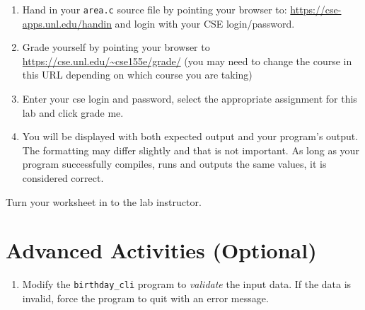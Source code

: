 \documentclass[12pt]{scrartcl}
\begin{document}
\begin{enumerate}
  \item Hand in your \texttt{area.c} source file by pointing your browser to:
  	\url{https://cse-apps.unl.edu/handin} and login with your CSE
	login/password.
  \item Grade yourself by pointing your browser to
  	\url{https://cse.unl.edu/~cse155e/grade/} (you may need to change the course
	in this URL depending on which course you are taking)
  \item Enter your cse login and password, select the appropriate assignment for
  	this lab and click grade me.
  \item You will be displayed with both expected output and your program's output.
	The formatting may differ slightly and that is not important.  As long as your
	program successfully compiles, runs and outputs the same values, it is considered
	correct.
\end{enumerate}

Turn your worksheet in to the lab instructor.

\section{Advanced Activities (Optional)}

\begin{enumerate}
  \item Modify the \texttt{birthday_cli} program to
    \emph{validate} the input data.  If the data is invalid, 
    force the program to quit with an error message.
\end{enumerate}
\end{document}
